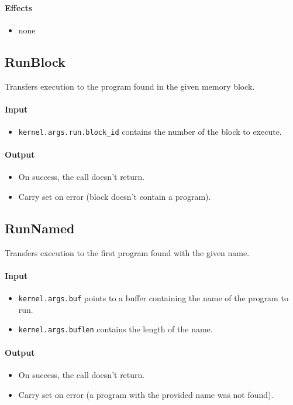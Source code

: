\paragraph{Effects}
\begin{itemize}
\item none
\end{itemize}


\subsection*{RunBlock}
Transfers execution to the program found in the given memory block.

\paragraph{Input}
\begin{itemize}
\item \verb+kernel.args.run.block_id+ contains the number of the block to execute.
\end{itemize}

\paragraph{Output}
\begin{itemize}
\item On success, the call doesn't return.
\item Carry set on error (block doesn't contain a program).
\end{itemize}


\subsection*{RunNamed}
Transfers execution to the first program found with the given name.

\paragraph{Input}
\begin{itemize}
\item \verb+kernel.args.buf+ points to a buffer containing the name of the program to run.
\item \verb+kernel.args.buflen+ contains the length of the name. 
\end{itemize}

\paragraph{Output}
\begin{itemize}
\item On success, the call doesn't return.
\item Carry set on error (a program with the provided name was not found).
\end{itemize}

